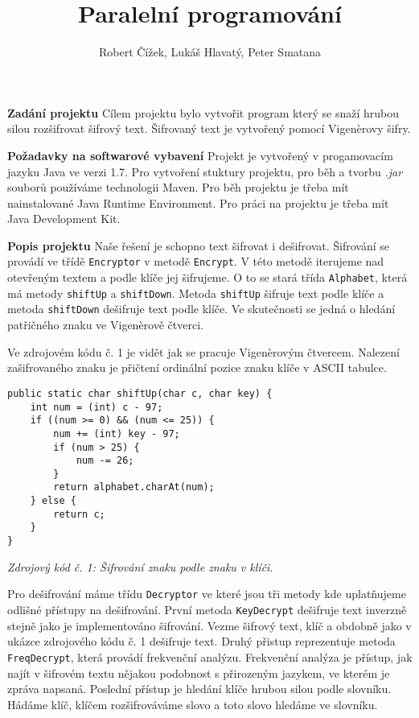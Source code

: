\documentclass{article}
\title{Paralelní programování}
\author{Robert Čížek, Lukáš Hlavatý, Peter Smatana}
\begin{document}
\maketitle

\textbf{Zadání projektu}
\newline
Cílem projektu bylo vytvořit program který se snaží hrubou silou rozšifrovat šifrový text.
Šifrovaný text je vytvořený pomocí Vigenèrovy šifry.
\newline

\textbf{Požadavky na softwarové vybavení}
Projekt je vytvořený v progamovacím jazyku Java ve verzi 1.7. Pro vytvoření stuktury projektu,
pro běh a tvorbu \textit{.jar} souborů používáme technologii Maven. Pro běh projektu je třeba
mít nainstalované Java Runtime Environment. Pro práci na projektu je třeba mít Java Development
Kit.
\newline

\textbf{Popis projektu}
\newline
Naše řešení je schopno text šifrovat i dešifrovat. Šifrování se provádí ve třídě
\texttt{Encryptor} v metodě \texttt{Encrypt}. V této metodě iterujeme nad otevřeným textem
a podle klíče jej šifrujeme. O to se stará třída \texttt{Alphabet}, která má metody
\texttt{shiftUp} a \texttt{shiftDown}. Metoda \texttt{shiftUp} šifruje text podle klíče
a metoda \texttt{shiftDown} dešifruje text podle klíče. Ve skutečnosti se jedná o hledání
patřičného znaku ve Vigenèrově čtverci.

Ve zdrojovém kódu č. 1 je vidět jak se pracuje Vigenèrovým čtvercem. Nalezení zašifrovaného znaku
je přičtení ordinální pozice znaku klíče v ASCII tabulce.

\begin{center}
\begin{lstlisting}
public static char shiftUp(char c, char key) {
	int num = (int) c - 97;
	if ((num >= 0) && (num <= 25)) {
		num += (int) key - 97;
		if (num > 25) {
			num -= 26;
		}
		return alphabet.charAt(num);
	} else {
		return c;
	}
}
\end{lstlisting}
\vspace{1mm}
\textit{Zdrojový kód č. 1: Šifrování znaku podle znaku v klíči.}
\end{center}

Pro dešifrování máme třídu \texttt{Decryptor} ve které jsou tři metody kde uplatňujeme
odlišné přístupy na dešifrování. První metoda \texttt{KeyDecrypt} dešifruje text inverzně
stejně jako je implementováno šifrování. Vezme šifrový text, klíč a obdobně jako v ukázce
zdrojového kódu č. 1 dešifruje text. Druhý přistup reprezentuje metoda \texttt{FreqDecrypt},
která provádí frekvenční analýzu. Frekvenční analýza je přístup, jak najít v šifrovém textu
nějakou podobnost s přirozeným jazykem, ve kterém je zpráva napsaná. Poslední přístup je
hledání klíče hrubou silou podle slovníku. Hádáme klíč, klíčem rozšifrováváme slovo a toto
slovo hledáme ve slovníku.
\newline
\end{document}
